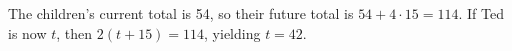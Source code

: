 The children's current total is 54, so their future total is $ 54+4\cdot15=114 $. If Ted is now $ t $, then $ 2(t+15)=114 $, yielding $\boxed{t=42}$.
